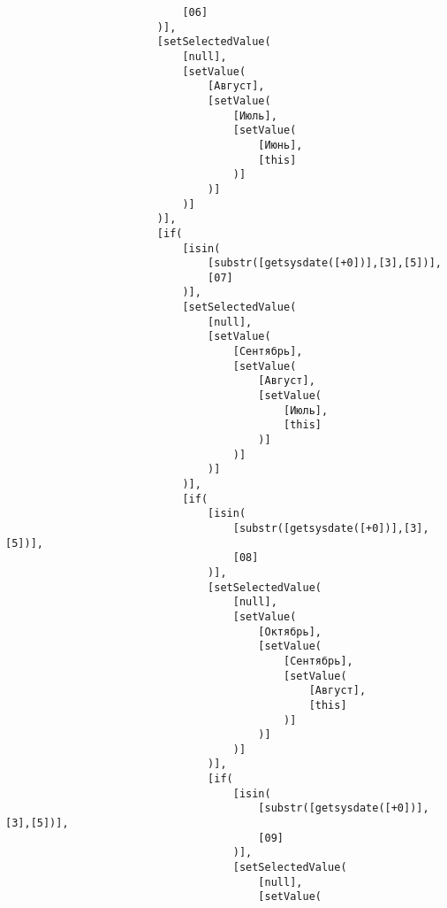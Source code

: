 \documentclass[10pt]{book}
\begin{document}
\begin{verbatim}
                            [06]
                        )],
                        [setSelectedValue(
                            [null],
                            [setValue(
                                [Август],
                                [setValue(
                                    [Июль],
                                    [setValue(
                                        [Июнь],
                                        [this]
                                    )]
                                )]
                            )]
                        )],
                        [if(
                            [isin(
                                [substr([getsysdate([+0])],[3],[5])],
                                [07]
                            )],
                            [setSelectedValue(
                                [null],
                                [setValue(
                                    [Сентябрь],
                                    [setValue(
                                        [Август],
                                        [setValue(
                                            [Июль],
                                            [this]
                                        )]
                                    )]
                                )]
                            )],
                            [if(
                                [isin(
                                    [substr([getsysdate([+0])],[3],[5])],
                                    [08]
                                )],
                                [setSelectedValue(
                                    [null],
                                    [setValue(
                                        [Октябрь],
                                        [setValue(
                                            [Сентябрь],
                                            [setValue(
                                                [Август],
                                                [this]
                                            )]
                                        )]
                                    )]
                                )],
                                [if(
                                    [isin(
                                        [substr([getsysdate([+0])],[3],[5])],
                                        [09]
                                    )],
                                    [setSelectedValue(
                                        [null],
                                        [setValue(

\end{verbatim}
\end{document}
